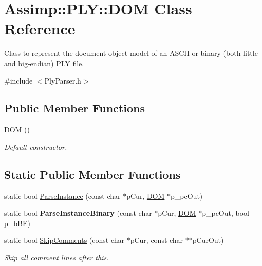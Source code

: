 \hypertarget{class_assimp_1_1_p_l_y_1_1_d_o_m}{\section{Assimp\+:\+:P\+L\+Y\+:\+:D\+O\+M Class Reference}
\label{class_assimp_1_1_p_l_y_1_1_d_o_m}
}


Class to represent the document object model of an A\+S\+C\+I\+I or binary (both little and big-\/endian) P\+L\+Y file.  




{\ttfamily \#include $<$Ply\+Parser.\+h$>$}

\subsection*{Public Member Functions}
\begin{DoxyCompactItemize}
\item 
\hypertarget{class_assimp_1_1_p_l_y_1_1_d_o_m_ae4b6407c1e5fb9fe87a84244d9559179}{\hyperlink{class_assimp_1_1_p_l_y_1_1_d_o_m_ae4b6407c1e5fb9fe87a84244d9559179}{D\+O\+M} ()}\label{class_assimp_1_1_p_l_y_1_1_d_o_m_ae4b6407c1e5fb9fe87a84244d9559179}

\begin{DoxyCompactList}\small\item\em Default constructor. \end{DoxyCompactList}\end{DoxyCompactItemize}
\subsection*{Static Public Member Functions}
\begin{DoxyCompactItemize}
\item 
static bool \hyperlink{class_assimp_1_1_p_l_y_1_1_d_o_m_ae942173c25241c21be8a4307503945a5}{Parse\+Instance} (const char $\ast$p\+Cur, \hyperlink{class_assimp_1_1_p_l_y_1_1_d_o_m}{D\+O\+M} $\ast$p\+\_\+pc\+Out)
\item 
\hypertarget{class_assimp_1_1_p_l_y_1_1_d_o_m_a46eda3968e27e421a1c19c30291e8bdb}{static bool {\bfseries Parse\+Instance\+Binary} (const char $\ast$p\+Cur, \hyperlink{class_assimp_1_1_p_l_y_1_1_d_o_m}{D\+O\+M} $\ast$p\+\_\+pc\+Out, bool p\+\_\+b\+B\+E)}\label{class_assimp_1_1_p_l_y_1_1_d_o_m_a46eda3968e27e421a1c19c30291e8bdb}

\item 
\hypertarget{class_assimp_1_1_p_l_y_1_1_d_o_m_add47cfc723df2381c245ded8edbdc709}{static bool \hyperlink{class_assimp_1_1_p_l_y_1_1_d_o_m_add47cfc723df2381c245ded8edbdc709}{Skip\+Comments} (const char $\ast$p\+Cur, const char $\ast$$\ast$p\+Cur\+Out)}\label{class_assimp_1_1_p_l_y_1_1_d_o_m_add47cfc723df2381c245ded8edbdc709}

\begin{DoxyCompactList}\small\item\em Skip all comment lines after this. \end{DoxyCompactList}\end{DoxyCompactItemize}
